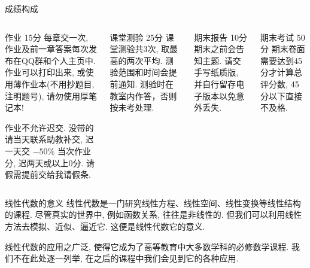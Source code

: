 \begin{frame}{成绩构成}
	\onslide<+->
	\begin{columns}
		\onslide<+->
		\begin{block*}{作业 15分}
			\vspace{\baselineskip}
			每章交一次, 作业及前一章答案每次发布在QQ群和个人主页中. 
			作业可以打印出来, 或使用薄作业本(不用抄题目, 注明题号), 请勿使用厚笔记本! 
			\vspace{\baselineskip}

			\alert{作业不允许迟交}. 没带的请当天联系助教补交, 迟一天交 $-50\%$ 当次作业分, 迟两天或以上0分. 请假需提前交给我请假条. 
			\vspace{1.1\baselineskip}
		\end{block*}

		\onslide<+->
		\begin{block*}{课堂测验 25分}
			课堂测验共3次, 取最高的两次平均. 测验范围和时间会提前通知. \alert{测验时在教室内作答，否则按未考处理}. 
		\end{block*}

		\onslide<+->
		\begin{block*}{期末报告 10分}
			期末之前会告知主题. 请交手写纸质版, 并自行留存电子版本以免意外丢失. 
		\end{block*}

		\onslide<+->
		\begin{block*}{期末考试 50分}
			期末卷面需要达到45分才计算总评分数, 45分以下直接不及格. 
	\end{block*}
	\end{columns}
\end{frame}


\begin{frame}{线性代数的意义}
	\onslide<+->
	线性代数是一门研究线性方程、线性空间、线性变换等线性结构的课程.
	\onslide<+->
	尽管真实的世界中, 例如函数关系, 往往是非线性的.
	但我们可以利用线性方法去模拟、近似、逼近它.
	\onslide<+->
	这便是线性代数它的意义.

	\onslide<+->
	线性代数的应用之广泛, 使得它成为了高等教育中大多数学科的必修数学课程.
	\onslide<+->
	我们不在此处逐一列举, 在之后的课程中我们会见到它的各种应用.
\end{frame}


